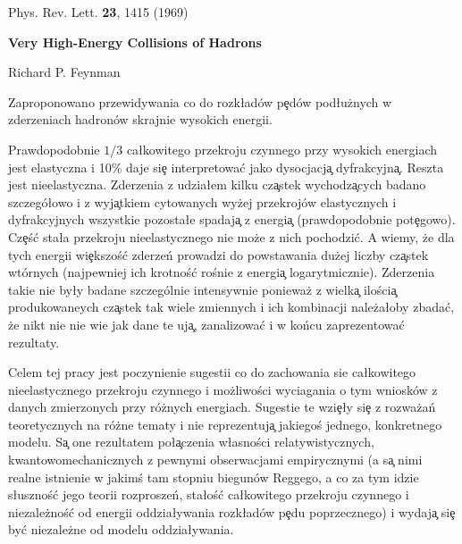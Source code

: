 \sloppy
{}

\noindent

Phys. Rev. Lett. {\bf 23}, 1415 (1969)
\hline
\vspace{.5cm}

\begin{center}
\textcolor{mycolor}
{\Large \bf Very High-Energy Collisions of Hadrons}
\vspace{.5cm}

{\large Richard P. Feynman}%
 \vspace{.5cm}

\begin{minipage}{12cm}
Zaproponowano przewidywania co do rozk\l ad\'{o}w p\c{e}d\'{o}w pod\l u\.{z}nych
w zderzeniach hadron\'{o}w skrajnie wysokich energii.
\end{minipage}
\end{center}
\vspace{1cm}


Prawdopodobnie $1/3$ ca\l kowitego przekroju czynnego przy wysokich energiach jest
elastyczna i 10\% daje si\c{e} interpretowa\'{c} jako dysocjacj\c{a}
dyfrakcyjn\c{a}. Reszta jest nieelastyczna. Zderzenia z udzia\l em kilku cz\c{a}stek
wychodz\c{a}cych badano szczeg\'{o}\l owo i z wyj\c{a}tkiem
cytowanych wy\.{z}ej przekroj\'{o}w elastycznych i dyfrakcyjnych wszystkie pozosta\l e
spadaj\c{a} z energi\c{a} (prawdopodobnie pot\c{e}gowo). Cz\c{e}\'{s}\'{c} sta\l a
przekroju nieelastycznego nie mo\.{z}e z nich pochodzi\'{c}.
A wiemy, \.{z}e dla tych energii wi\c{e}kszo\'{s}\'{c} zderze\'{n} prowadzi
do powstawania du\.{z}ej liczby cz\c{a}stek wt\'{o}rnych
(najpewniej ich krotno\'{s}\'{c} ro\'{s}nie z energi\c{a} logarytmicznie).
Zderzenia takie nie by\l y badane szczeg\'{o}lnie intensywnie poniewa\.{z}
z wielk\c{a} ilo\'{s}ci\c{a} produkowaneych cz\c{a}stek
tak wiele zmiennych i ich kombinacji nale\.{z}a\l oby zbada\'{c}, \.{z}e
nikt nie nie wie jak dane te uj\c{a}, zanalizowa\'{c} i w ko\'{n}cu zaprezentowa\'{c}
rezultaty.

Celem tej pracy jest poczynienie sugestii co do zachowania sie
ca\l kowitego nieelastycznego przekroju czynnego
i mo\.{z}liwo\'{s}ci wyciagania o tym wniosk\'{o}w
z danych zmierzonych przy r\'{o}\.{z}nych energiach.
Sugestie te wzi\c{e}\l y si\c{e} z rozwa\.{z}a\'{n} teoretycznych
na r\'{o}\.{z}ne tematy i nie reprezentuj\c{a} jakiego\'{s} jednego, konkretnego modelu.
S\c{a} one rezultatem po\l \c{a}czenia w\l asno\'{s}ci
 relatywistycznych, kwantowomechanicznych z pewnymi obserwacjami
 empirycznymi (a s\c{a} nimi realne istnienie
 w jakim\'{s} tam stopniu biegun\'{o}w Reggego, a co za tym idzie s\l uszno\'{s}\'{c}
 jego teorii rozprosze\'{n}, sta\l o\'{s}\'{c} ca\l kowitego przekroju czynnego
 i niezale\.{z}no\'{s}\'{c} od energii oddzia\l ywania rozk\l ad\'{o}w p\c{e}du
 poprzecznego) i wydaj\c{a} si\c{e} by\'{c} niezale\.{z}ne od modelu oddzia\l ywania.

